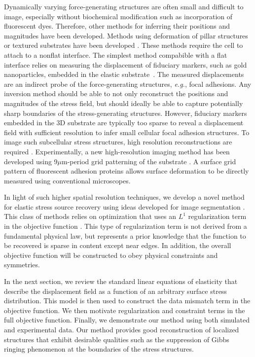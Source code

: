\documentclass[aps,prl,reprint,twocolumn,groupedaddress,showpacs]{revtex4-1}
\begin{document}
Dynamically varying force-generating structures are often small and
difficult to image, especially without biochemical modification such
as incorporation of fluorescent dyes. Therefore, other methods for
inferring their positions and magnitudes have been developed. Methods
using deformation of pillar structures \cite{PILLAR} or textured
substrates have been developed \cite{PATTERN}.  These methods require
the cell to attach to a nonflat interface.  The simplest method
compabible with a flat interface relies on measuring the displacement
of fiduciary markers, such as gold nanoparticles, embedded in the
elastic substrate~\cite{WANG2007}. The measured displacements are an
indirect probe of the force-generating structures, \textit{e.g.},
focal adhesions.  Any inversion method should be able to not only
reconstruct the positions and magnitudes of the stress field, but
should ideally be able to capture potentially sharp boundaries of the
stress-generating structures. However, fiduciary markers embedded in
the 3D substrate are typically too sparse to reveal a displacement
field with sufficient resolution to infer small cellular focal
adhesion structures. To image such subcellular stress structures, high
resolution reconstructions are required \cite{USCHWARZ}.
Experimentally, a new high-resolution imaging method has been
developed using 9$\mu$m-period grid patterning of the substrate
\cite{POPESCU}.  A surface grid pattern of fluorescent adhesion
proteins allows surface deformation to be directly measured using
conventional microscopes.

In light of such higher spatial resolution techniques, we develop a
novel method for elastic stress source recovery using ideas developed
for image segmentation \cite{OSHER}.  This class of methods relies on
optimization that uses an $L^{1}$ regularization term in the objective
function \cite{CHAN}.  This type of regularization term is not derived
from a fundamental physical law, but represents a prior knowledge that
the function to be recovered is sparse in content except near
edges. In addition, the overall objective function will be constructed
to obey physical constraints and symmetries.

In the next section, we review the standard linear equations of
elasticity that describe the displacement field as a function of an
arbitrary surface stress distribution. This model is then used to
construct the data mismatch term in the objective function. We then
motivate regularization and constraint terms in the full
objective function. Finally, we demonstrate our method
using both simulated and experimental data. Our method provides
good reconstruction of localized structures that exhibit desirable
qualities such as the suppression of Gibbs ringing phenomenon at the
boundaries of the stress structures.
\end{document}
